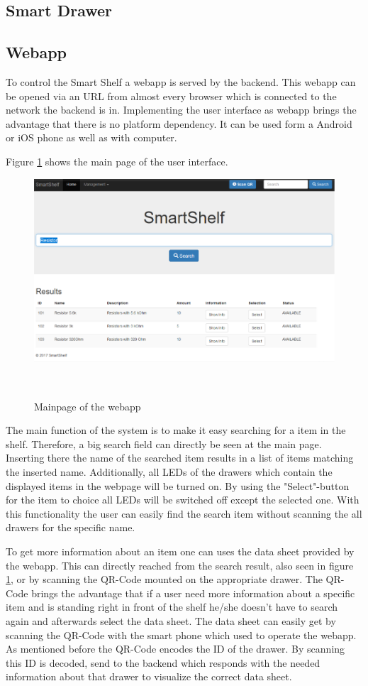 \subsection{Smart Drawer}

\subsection{Webapp}
To control the Smart Shelf a webapp is served by the backend. 
This webapp can be opened via an URL from almost every browser which is connected to the network the backend is in. 
Implementing the user interface as webapp brings the advantage that there is no platform dependency. 
It can be used form a Android or iOS phone as well as with computer. 

Figure \ref{fig:webapp-mainpage} shows the main page of the user interface. 
%
\begin{figure}
	\centering
	\includegraphics[width=1.3\columnwidth]{figures/ui-mainpage.png}
	\caption{Mainpage of the webapp}~\label{fig:webapp-mainpage}
\end{figure}
%
The main function of the system is to make it easy searching for a item in the shelf. 
Therefore, a big search field can directly be seen at the main page. 
Inserting there the name of the searched item results in a list of items matching the inserted name. 
Additionally, all LEDs of the drawers which contain the displayed items in the webpage will be turned on. 
By using the "Select"-button for the item to choice all LEDs will be switched off except the selected one. 
With this functionality the user can easily find the search item without scanning the all drawers for the specific name. 

To get more information about an item one can uses the data sheet provided by the webapp. 
This can directly reached from the search result, also seen in figure \ref{fig:webapp-mainpage}, or by scanning the QR-Code mounted on the appropriate drawer. 
The QR-Code brings the advantage that if a user need more information about a specific item and is standing right in front of the shelf he/she doesn't have to search again and afterwards select the data sheet. 
The data sheet can easily get by scanning the QR-Code with the smart phone which used to operate the webapp. 
As mentioned before the QR-Code encodes the ID of the drawer. 
By scanning this ID is decoded, send to the backend which responds with the needed information about that drawer to visualize the correct data sheet. 